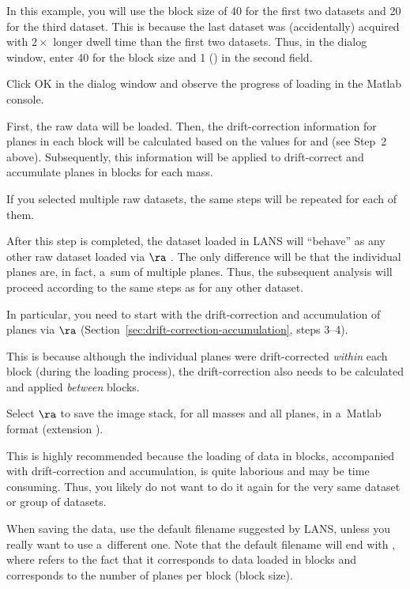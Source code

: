 \bul In this example, you will use the block size of 40 for the first two datasets and 20 for the third dataset. This is because the last dataset was (accidentally) acquired with $2\times$ longer dwell time than the first two datasets. Thus, in the dialog window, enter 40 for the block size and 1 () in the second field.

\s Click OK in the dialog window and observe the progress of loading in the Matlab console.

\bul First, the raw data will be loaded. Then, the drift-correction information for planes in each block will be calculated based on the values for  and  (see Step~2 above). Subsequently, this information will be applied to drift-correct and accumulate planes in blocks for each mass.

\bul If you selected multiple raw datasets, the same steps will be repeated for each of them.

\bul After this step is completed, the dataset loaded in LANS will ``behave'' as any other raw dataset loaded via  $\ra$ . The only difference will be that the individual planes are, in fact, a~sum of multiple planes. Thus, the subsequent analysis will proceed according to the same steps as for any other dataset. 

\s In particular, you need to start with the drift-correction and accumulation of planes via  $\ra$  (Section~\ref{sec:drift-correction-accumulation}, steps 3--4). 

\bul This is because although the individual planes were drift-corrected \emph{within} each block (during the loading process), the drift-correction also needs to be calculated and applied \emph{between} blocks.

\s Select  $\ra$  to save the image stack, for all masses and all planes, in a~Matlab format (extension ).

\bul This is highly recommended because the loading of data in blocks, accompanied with drift-correction and accumulation, is quite laborious and may be time consuming. Thus, you likely do not want to do it again for the very same dataset or group of datasets. 

\bul When saving the data, use the default filename suggested by LANS, unless you really want to use a~different one. Note that the default filename will end with , where  refers to the fact that it corresponds to data loaded in blocks and  corresponds to the number of planes per block (block size).


